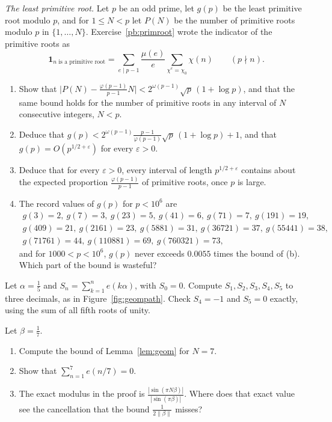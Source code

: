 \begin{exercise}[$\star\star\star$]\label{pb:leastprimroot}
\emph{The least primitive root.} Let $p$ be an odd prime, let $g(p)$ be the least primitive root modulo $p$, and for $1\le N<p$ let $P(N)$ be the number of primitive
roots modulo $p$ in $\{1,\dots,N\}$. Exercise~\ref{pb:primroot} wrote the indicator of the primitive roots as
\[
\mathbf 1_{\text{$n$ is a primitive root}}=\sum_{e\mid p-1}\frac{\mu(e)}e\sum_{\chi^e=\chi_0}\chi(n)\qquad(p\nmid n).
\]
\begin{enumerate}[label=(\alph*)]
\item Show that $\bigl|P(N)-\frac{\varphi(p-1)}{p-1}N\bigr|<2^{\omega(p-1)}\sqrt p\,(1+\log p)$, and that the same bound holds for the number of primitive roots in any
interval of $N$ consecutive integers, $N<p$.
\item Deduce that $g(p)<2^{\omega(p-1)}\frac{p-1}{\varphi(p-1)}\sqrt p\,(1+\log p)+1$, and that $g(p)=O(p^{1/2+\varepsilon})$ for every $\varepsilon>0$.
\item Deduce that for every $\varepsilon>0$, every interval of length $p^{1/2+\varepsilon}$ contains about the expected proportion $\frac{\varphi(p-1)}{p-1}$ of
primitive roots, once $p$ is large.
\item The record values of $g(p)$ for $p<10^6$ are
\[
\begin{gathered}
g(3)=2,\ g(7)=3,\ g(23)=5,\ g(41)=6,\ g(71)=7,\ g(191)=19,\\
g(409)=21,\ g(2161)=23,\ g(5881)=31,\ g(36721)=37,\ g(55441)=38,\\
g(71761)=44,\ g(110881)=69,\ g(760321)=73,
\end{gathered}
\]
and for $1000<p<10^6$, $g(p)$ never exceeds $0.0055$ times the bound of (b). Which part of the bound is wasteful?
\end{enumerate}
\end{exercise}

\begin{exercise}[$\star$]\label{ex:fifthsums}
Let $\alpha=\frac15$ and $S_n=\sum_{k=1}^n e(k\alpha)$, with $S_0=0$. Compute $S_1,S_2,S_3,S_4,S_5$ to three decimals, as in Figure~\ref{fig:geompath}. Check $S_4=-1$ and $S_5=0$ exactly, using the sum of all fifth roots of unity.
\end{exercise}

\begin{exercise}[$\star\star$]\label{ex:seventhbound}
Let $\beta=\frac17$.
\begin{enumerate}[label=(\alph*)]
\item Compute the bound of Lemma~\ref{lem:geom} for $N=7$.
\item Show that $\sum_{n=1}^7 e(n/7)=0$.
\item The exact modulus in the proof is $\frac{|\sin(\pi N\beta)|}{|\sin(\pi\beta)|}$. Where does that exact value see the cancellation that the bound $\frac1{2\|\beta\|}$ misses?
\end{enumerate}
\end{exercise}

